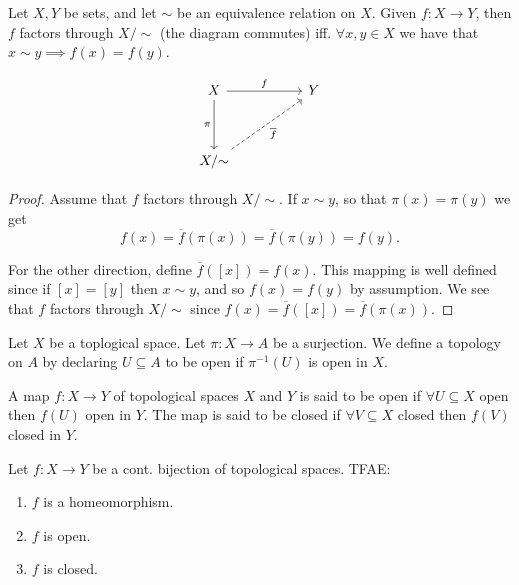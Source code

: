 \begin{proposition}
   Let \( X, Y \) be sets, and let \( \sim \) be an equivalence relation
   on \( X \).
   Given \( f: X \to  Y \), then \( f \) factors through
   \( X / {\sim} \) (the diagram commutes) iff. \( \forall x, y \in X \) we have that
   \( x \sim y \implies f(x) = f(y) \).

\[\begin{tikzcd}
	X && Y \\
	\\
	{X/{\sim}}
	\arrow["f", from=1-1, to=1-3]
	\arrow["\pi"', from=1-1, to=3-1]
	\arrow["{\overline{f}}"', dashed, from=3-1, to=1-3]
\end{tikzcd}\]
\end{proposition}

\begin{proof}
  Assume that \( f \) factors through \( X / {\sim} \).
  If \( x \sim y \), so that \( \pi(x) = \pi(y) \)
  we get
  \[
    f(x) = \overline{f}(\pi(x)) = \overline{f}(\pi(y)) = f(y).
  \]

  For the other direction, define \( \overline{f}([x]) = f(x) \).
  This mapping is well defined since if \( [x] = [y] \) then
  \( x \sim y \), and so \( f(x) = f(y) \) by assumption.
  We see that \( f  \) factors through \( X /{\sim} \) since
  \( f(x) = \overline{f}([x]) = \overline{f}(\pi(x)) \).
\end{proof}

\begin{definition}
   Let \( X \) be a toplogical space.
   Let \( \pi:X \to A \) be a surjection.
   We define a topology on \( A \) by 
   declaring \( U \subseteq A \) to be open
   if \( {\pi}^{-1} (U) \) is open in \( X \).
\end{definition}

\begin{definition}
   A map \( f:X \to Y  \) of topological spaces \( X \) and \( Y \)
   is said to be open if \( \forall U \subseteq X \) open then \( f(U) \) open in \( Y \). The map is said to be closed if 
\( \forall V \subseteq X \) closed then \( f(V) \) closed in \( Y \).
\end{definition}

\begin{theorem}
    Let \( f:X \to Y \) be a cont. bijection of topological spaces.
    TFAE:
    \begin{enumerate}
      \item \( f \) is a homeomorphism.
      \item \( f \) is open.
      \item \( f \) is closed.
    \end{enumerate}
\end{theorem}

